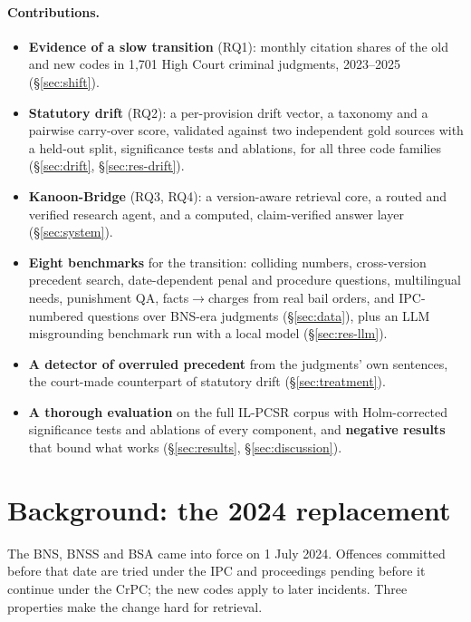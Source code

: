 \documentclass[sigconf,nonacm]{acmart}
\begin{document}
\paragraph{Contributions.}
\begin{itemize}
\item \textbf{Evidence of a slow transition} (RQ1): monthly citation shares of the old and new
codes in 1,701 High Court criminal judgments, 2023--2025 (\S\ref{sec:shift}).
\item \textbf{Statutory drift} (RQ2): a per-provision drift vector, a taxonomy and a pairwise
carry-over score, validated against two independent gold sources with a held-out split,
significance tests and ablations, for all three code families (\S\ref{sec:drift},
\S\ref{sec:res-drift}).
\item \textbf{Kanoon-Bridge} (RQ3, RQ4): a version-aware retrieval core, a routed and verified
research agent, and a computed, claim-verified answer layer (\S\ref{sec:system}).
\item \textbf{Eight benchmarks} for the transition: colliding numbers, cross-version precedent
search, date-dependent penal and procedure questions, multilingual needs, punishment QA,
facts$\to$charges from real bail orders, and IPC-numbered questions over BNS-era judgments
(\S\ref{sec:data}), plus an LLM misgrounding benchmark run with a local model (\S\ref{sec:res-llm}).
\item \textbf{A detector of overruled precedent} from the judgments' own sentences, the court-made
counterpart of statutory drift (\S\ref{sec:treatment}).
\item \textbf{A thorough evaluation} on the full IL-PCSR corpus with Holm-corrected significance
tests and ablations of every component, and \textbf{negative results} that bound what works
(\S\ref{sec:results}, \S\ref{sec:discussion}).
\end{itemize}

\section{Background: the 2024 replacement}\label{sec:background}

The BNS, BNSS and BSA came into force on 1 July 2024. Offences committed before that date are
tried under the IPC and proceedings pending before it continue under the CrPC; the new codes
apply to later incidents. Three properties make the change hard for retrieval.
\end{document}
